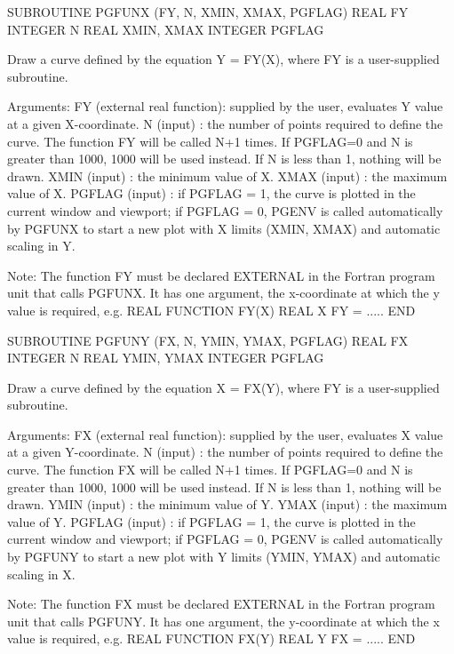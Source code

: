 {\eightpoint\begintt
      SUBROUTINE PGFUNX (FY, N, XMIN, XMAX, PGFLAG)
      REAL FY
      INTEGER N
      REAL XMIN, XMAX
      INTEGER PGFLAG
 
Draw a curve defined by the equation Y = FY(X), where FY is a
user-supplied subroutine.
 
Arguments:
 FY     (external real function): supplied by the user, evaluates
                   Y value at a given X-coordinate.
 N      (input)  : the number of points required to define the
                   curve. The function FY will be called N+1 times.
                   If PGFLAG=0 and N is greater than 1000, 1000
                   will be used instead.  If N is less than 1,
                   nothing will be drawn.
 XMIN   (input)  : the minimum value of X.
 XMAX   (input)  : the maximum value of X.
 PGFLAG (input)  : if PGFLAG = 1, the curve is plotted in the
                   current window and viewport; if PGFLAG = 0,
                   PGENV is called automatically by PGFUNX to
                   start a new plot with X limits (XMIN, XMAX)
                   and automatic scaling in Y.
 
Note: The function FY must be declared EXTERNAL in the Fortran
program unit that calls PGFUNX.  It has one argument, the
x-coordinate at which the y value is required, e.g.
  REAL FUNCTION FY(X)
  REAL X
  FY = .....
  END
\endtt}

{\eightpoint\begintt
      SUBROUTINE PGFUNY (FX, N, YMIN, YMAX, PGFLAG)
      REAL    FX
      INTEGER N
      REAL    YMIN, YMAX
      INTEGER PGFLAG
 
Draw a curve defined by the equation X = FX(Y), where FY is a
user-supplied subroutine.
 
Arguments:
 FX     (external real function): supplied by the user, evaluates
                   X value at a given Y-coordinate.
 N      (input)  : the number of points required to define the
                   curve. The function FX will be called N+1 times.
                   If PGFLAG=0 and N is greater than 1000, 1000
                   will be used instead.  If N is less than 1,
                   nothing will be drawn.
 YMIN   (input)  : the minimum value of Y.
 YMAX   (input)  : the maximum value of Y.
 PGFLAG (input)  : if PGFLAG = 1, the curve is plotted in the
                   current window and viewport; if PGFLAG = 0,
                   PGENV is called automatically by PGFUNY to
                   start a new plot with Y limits (YMIN, YMAX)
                   and automatic scaling in X.
 
Note: The function FX must be declared EXTERNAL in the Fortran
program unit that calls PGFUNY.  It has one argument, the
y-coordinate at which the x value is required, e.g.
  REAL FUNCTION FX(Y)
  REAL Y
  FX = .....
  END
\endtt}

